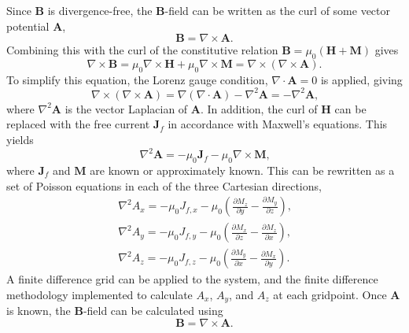 Since \(\mathbf{B}\) is divergence-free, the \(\mathbf{B}\)-field can be written as the curl of some vector potential \(\mathbf{A}\),
\begin{equation}
    \mathbf{B} = \nabla \times \mathbf{A} \text{.}
\end{equation}
Combining this with the curl of the constitutive relation \(\mathbf{B} = \mu_0 \left( \mathbf{H} + \mathbf{M} \right)\) gives
\begin{equation}
    \nabla \times \mathbf{B} = \mu_0 \nabla \times \mathbf{H} + \mu_0 \nabla \times \mathbf{M} = \nabla \times \left( \nabla \times \mathbf{A} \right) \text{.}
\end{equation}
To simplify this equation, the Lorenz gauge condition, \(\nabla \cdot \mathbf{A} = 0\) is applied, giving
\begin{equation}
    \nabla \times \left( \nabla \times \mathbf{A} \right) = \nabla \left( \nabla \cdot \mathbf{A} \right) - \nabla^2 \mathbf{A} = -\nabla ^2 \mathbf{A} \text{,}
\end{equation}
where \(\nabla^2 \mathbf{A}\) is the vector Laplacian of \(\mathbf{A}\). In addition, the curl of \(\mathbf{H}\) can be replaced with the free current \(\mathbf{J}_f\) in accordance with Maxwell's equations. This yields
\begin{equation}
    \nabla ^2 \mathbf{A} = -\mu_0 \mathbf{J}_f - \mu_0 \nabla \times \mathbf{M} \text{,}
\end{equation}
where \(\mathbf{J}_f\) and \(\mathbf{M}\) are known or approximately known. This can be rewritten as a set of Poisson equations in each of the three Cartesian directions,
\begin{align}
    \nabla ^2 A_x = -\mu_0 J_{f,x} - \mu_0 \left( \frac{\partial M_z}{\partial y} - \frac{\partial M_y}{\partial z} \right) \text{,} \nonumber \\
    \nabla ^2 A_y = -\mu_0 J_{f,y} - \mu_0 \left( \frac{\partial M_x}{\partial z} - \frac{\partial M_z}{\partial x} \right) \text{,} \\
    \nabla ^2 A_z = -\mu_0 J_{f,z} - \mu_0 \left( \frac{\partial M_y}{\partial x} - \frac{\partial M_x}{\partial y} \right) \nonumber \text{.}
\end{align}
A finite difference grid can be applied to the system, and the finite difference methodology implemented to calculate \(A_x\), \(A_y\), and \(A_z\) at each gridpoint. Once \(\mathbf{A}\) is known, the \(\mathbf{B}\)-field can be calculated using
\begin{equation}
    \mathbf{B} = \nabla \times \mathbf{A} \text{.}
\end{equation}

